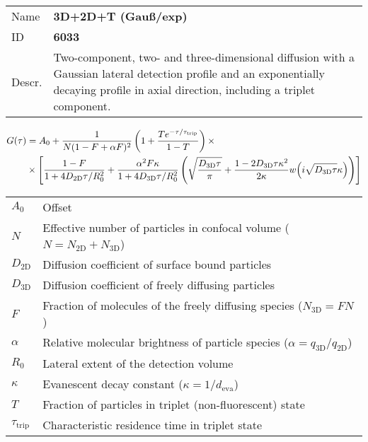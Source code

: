 \noindent \begin{tabular}{lp{}}
Name & \textbf{3D+2D+T (Gauß/exp)} \\ 
ID & \textbf{6033} \\ 
Descr. &  Two-component, two- and three-dimensional diffusion with a Gaussian lateral detection profile and an exponentially decaying profile in axial direction, including a triplet component. \\ 
\end{tabular}
\begin{align}
G(\tau) &= A_0 + \frac{1}{N (1-F + \alpha F)^2} \left(1 + \frac{T e^{-\tau/\tau_\mathrm{trip}}}{1-T}  \right)  \times \\
& \notag \times  \left[
\frac{1-F}{1+ 4 D_\mathrm{2D} \tau/R_0^2} + 
\frac{\alpha^2 F \kappa}{1+ 4 D_\mathrm{3D} \tau/R_0^2} 
\left( \sqrt{\frac{D_\mathrm{3D} \tau}{\pi}} + \frac{1 - 2 D_\mathrm{3D} \tau \kappa^2}{2 \kappa}  w\!\left(i \sqrt{D_\mathrm{3D} \tau} \kappa\right) \right) \right]
\end{align} 
\begin{center}
\begin{tabular}{ll}
$A_0$ & Offset \\ 
$N$ & Effective number of particles in confocal volume ($N = N_\mathrm{2D}+N_\mathrm{3D}$) \\ 
$D_\mathrm{2D}$ &  Diffusion coefficient of surface bound particles \\ 
$D_\mathrm{3D}$ &  Diffusion coefficient of freely diffusing particles \\ 
$F$ & Fraction of molecules of the freely diffusing species ($N_\mathrm{3D} = F N$) \\
$\alpha$ & Relative molecular brightness of particle species ($ \alpha = q_\mathrm{3D}/q_\mathrm{2D}$) \\
$R_0$ & Lateral extent of the detection volume \\
$\kappa$ &  Evanescent decay constant ($\kappa = 1/d_\mathrm{eva}$)\\ 
$T$ &  Fraction of particles in triplet (non-fluorescent) state\\ 
$\tau_\mathrm{trip}$ &  Characteristic residence time in triplet state \\ 
\end{tabular}
\end{center}
\vspace{2em}



